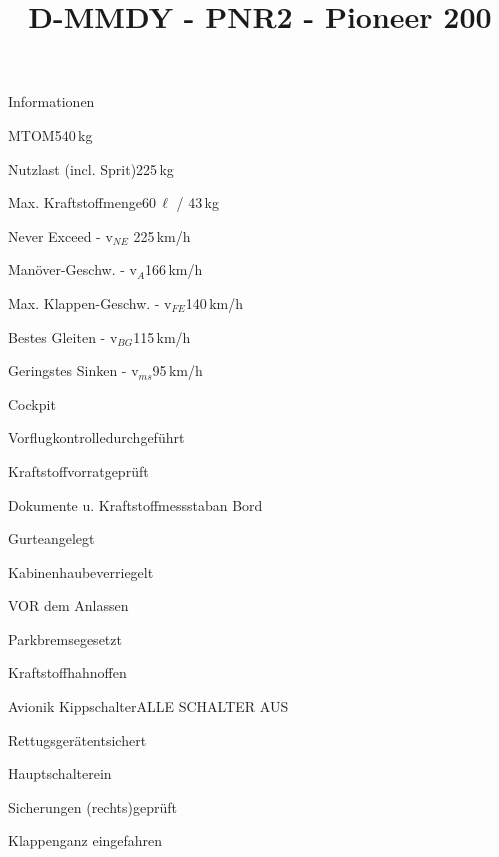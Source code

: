 \def\papersize{4}




\title{D-MMDY  -  PNR2  -  Pioneer 200}

\begin{checklist}{Informationen}
 	\item{MTOM}{540\,kg}
  	\item{Nutzlast (incl. Sprit)}{225\,kg}
  	\item{Max. Kraftstoffmenge}{60\,${\ell}$ / 43\,kg}
 	  \item{Never Exceed  -  v$_{NE}$ }{ 225\,km/h}
	  \item{Manöver-Geschw.  -  v$_{A}$}{166\,km/h}
	  \item{Max. Klappen-Geschw.  -  v$_{FE}$}{140\,km/h}
	  \item{Bestes Gleiten  -  v$_{BG}$}{115\,km/h}
	  \item{Geringstes Sinken  -  v$_{ms}$}{95\,km/h}
\end{checklist}

\begin{checklist}{Cockpit}
	\item{Vorflugkontrolle}{durchgeführt}
	\item{Kraftstoffvorrat}{geprüft}
	\item{Dokumente u. Kraftstoffmessstab}{an Bord}
	\item{Gurte}{angelegt}
	\item{Kabinenhaube}{verriegelt}
\end{checklist}

\begin{checklist}{VOR dem Anlassen}
	\item{Parkbremse}{gesetzt}
	\item{Kraftstoffhahn}{offen}
	\item{Avionik Kippschalter}{ALLE SCHALTER AUS}
	\item{Rettugsgerät}{entsichert}
	\item{Hauptschalter}{ein}
	\item{Sicherungen (rechts)}{geprüft}
	\item{Klappen}{ganz eingefahren}
\end{checklist}

